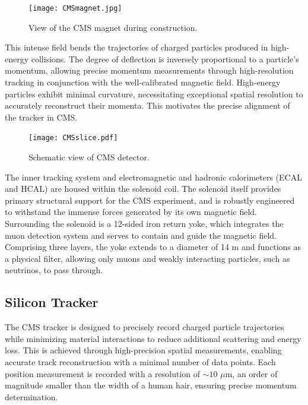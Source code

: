 \begin{figure}[!hbt]
    \begin{center}
        \texttt{[image: CMSmagnet.jpg]}
        \caption{View of the CMS magnet during construction.}
        \label{fig:CMSmagnet}
    \end{center}
\end{figure}

This intense field bends the trajectories of charged particles produced in high-energy collisions. The degree of deflection is inversely proportional to a particle’s momentum, allowing precise momentum measurements through high-resolution tracking in conjunction with the well-calibrated magnetic field. High-energy particles exhibit minimal curvature, necessitating exceptional spatial resolution to accurately reconstruct their momenta. This motivates the precise alignment of the tracker in CMS. 

\begin{figure}[!hbt]
    \begin{center}
        \texttt{[image: CMSslice.pdf]}
        \caption{Schematic view of CMS detector.}
        \label{fig:cmscutaway2}
    \end{center}
\end{figure}

The inner tracking system and electromagnetic and hadronic calorimeters (ECAL and HCAL) are housed within the solenoid coil. The solenoid itself provides primary structural support for the CMS experiment, and is robustly engineered to withstand the immense forces generated by its own magnetic field. Surrounding the solenoid is a 12-sided iron return yoke, which integrates the muon detection system and serves to contain and guide the magnetic field. Comprising three layers, the yoke extends to a diameter of 14 m and functions as a physical filter, allowing only muons and weakly interacting particles, such as neutrinos, to pass through. 

\subsection{Silicon Tracker}

The CMS tracker is designed to precisely record charged particle trajectories while minimizing material interactions to reduce additional scattering and energy loss. This is achieved through high-precision spatial measurements, enabling accurate track reconstruction with a minimal number of data points. Each position measurement is recorded with a resolution of $\sim10$ $\mu$m, an order of magnitude smaller than the width of a human hair, ensuring precise momentum determination.

